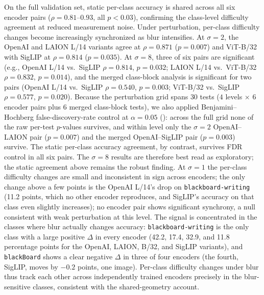 \documentclass[a4paper,fleqn]{cas-sc}
\begin{document}
On the full validation set, static per-class accuracy is shared across all six encoder pairs ($\rho = 0.81$--$0.93$, all $p < 0.03$), confirming the class-level difficulty agreement at reduced measurement noise. Under perturbation, per-class difficulty changes become increasingly synchronized as blur intensifies. At $\sigma=2$, the OpenAI and LAION L/14 variants agree at $\rho = 0.871$ ($p = 0.007$) and ViT-B/32 with SigLIP at $\rho = 0.814$ ($p = 0.035$). At $\sigma=8$, three of six pairs are significant (e.g., OpenAI L/14 vs.\ SigLIP $\rho = 0.814$, $p = 0.032$; LAION L/14 vs.\ ViT-B/32 $\rho = 0.832$, $p = 0.014$), and the merged class-block analysis is significant for two pairs (OpenAI L/14 vs.\ SigLIP $\rho = 0.540$, $p = 0.003$; ViT-B/32 vs.\ SigLIP $\rho = 0.577$, $p = 0.020$). Because the perturbation grid spans $30$ tests ($4$ levels $\times$ $6$ encoder pairs plus $6$ merged class-block tests), we also applied Benjamini--Hochberg false-discovery-rate control at $\alpha=0.05$ (): across the full grid none of the raw per-test $p$-values survives, and within level only the $\sigma=2$ OpenAI--LAION pair ($p=0.007$) and the merged OpenAI--SigLIP pair ($p=0.003$) survive. The static per-class accuracy agreement, by contrast, survives FDR control in all six pairs. The $\sigma=8$ results are therefore best read as exploratory; the static agreement above remains the robust finding. At $\sigma=1$ the per-class difficulty changes are small and inconsistent in sign across encoders; the only change above a few points is the OpenAI L/14's drop on \texttt{blackboard-writing} (11.2 points, which no other encoder reproduces, and SigLIP's accuracy on that class even slightly increases); no encoder pair shows significant synchrony, a null consistent with weak perturbation at this level. The signal is concentrated in the classes where blur actually changes accuracy: \texttt{blackboard-writing} is the only class with a large positive $\Delta$ in every encoder (42.2, 17.4, 32.9, and 11.8 percentage points for the OpenAI, LAION, B/32, and SigLIP variants), and \texttt{blackBoard} shows a clear negative $\Delta$ in three of four encoders (the fourth, SigLIP, moves by $-0.2$ points, one image). Per-class difficulty changes under blur thus track each other across independently trained encoders precisely in the blur-sensitive classes, consistent with the shared-geometry account.
\end{document}
